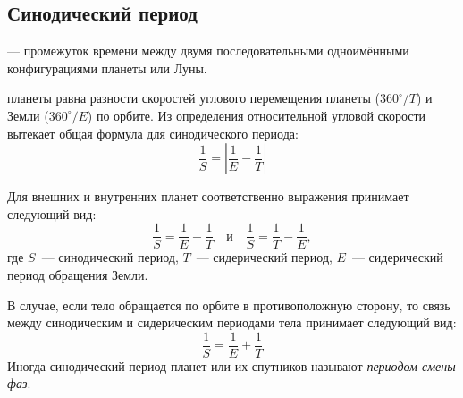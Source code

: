 \subsection{Синодический период}

 --- промежуток времени между двумя 
последовательными одноимёнными конфигурациями планеты или Луны.

 планеты равна 
разности скоростей углового перемещения планеты ($360^\circ/T$) и Земли ($360^\circ/E$) по 
орбите. Из определения относительной угловой скорости вытекает общая формула 
для синодического периода: \begin{equation}
\frac1S=\left| \frac1E-\frac1T \right|
\end{equation}

Для внешних и внутренних планет соответственно выражения принимает следующий вид: \begin{equation} \frac{1}{S} = \frac{1}{E} - \frac{1}{T} \quad \text{и} \quad \frac{1}{S} = \frac{1}{T} - \frac{1}{E},
\end{equation}
где $S$~--- синодический период, $T$~--- сидерический период, $E$~--- 
сидерический период обращения Земли.

В случае, если тело обращается по орбите в противоположную сторону, то связь 
между синодическим и сидерическим периодами тела принимает следующий вид:
\begin{equation}\frac1S=\frac1E+\frac1T
\end{equation}
Иногда синодический период планет или их спутников называют {\itshape периодом смены фаз}. 
